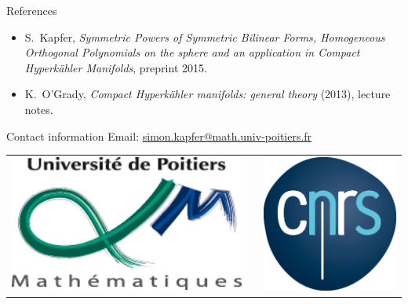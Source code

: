 \documentclass[final]{beamer}
\newlength{\onecolwid}
\begin{document}
\begin{frame}[t]
\begin{columns}[t]
\begin{column}{\onecolwid}

\begin{block}{References}

\begin{itemize}
\small
\item S.~Kapfer, \emph{Symmetric Powers of Symmetric Bilinear Forms, Homogeneous Orthogonal Polynomials on the sphere and an application in Compact Hyperk\"ahler Manifolds}, preprint 2015.
\item K.~O'Grady, \emph{Compact Hyperk\"ahler manifolds: general theory} (2013), lecture notes.
\end{itemize}
\end{block}




\begin{block}{Contact information}
Email: \href{mailto:simon.kapfer@math.univ-poitiers.fr}{simon.kapfer@math.univ-poitiers.fr}
\end{block}

\begin{center}
\begin{tabular}{ccc}
\includegraphics[height=45mm]{logo-Dept-Math-1.png} & \hspace{4cm} & \includegraphics[height=45mm]{logo-cnrs2.jpg}
\end{tabular}
\end{center}


\end{column}
\end{columns}
\end{frame}
\end{document}
